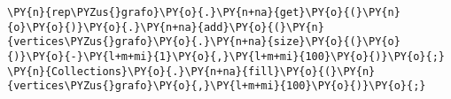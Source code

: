 \begin{Verbatim}[commandchars=\\\{\}]
\PY{n}{rep\PYZus{}grafo}\PY{o}{.}\PY{n+na}{get}\PY{o}{(}\PY{n}{o}\PY{o}{)}\PY{o}{.}\PY{n+na}{add}\PY{o}{(}\PY{n}{vertices\PYZus{}grafo}\PY{o}{.}\PY{n+na}{size}\PY{o}{(}\PY{o}{)}\PY{o}{-}\PY{l+m+mi}{1}\PY{o}{,}\PY{l+m+mi}{100}\PY{o}{)}\PY{o}{;}
\PY{n}{Collections}\PY{o}{.}\PY{n+na}{fill}\PY{o}{(}\PY{n}{vertices\PYZus{}grafo}\PY{o}{,}\PY{l+m+mi}{100}\PY{o}{)}\PY{o}{;}
\end{Verbatim}
